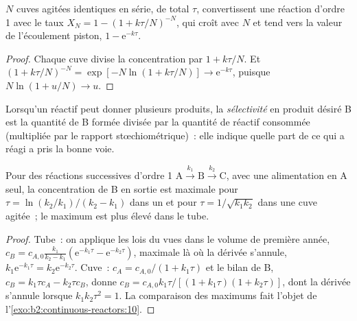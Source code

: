 \begin{proposition}\label{prop:b2:continuous-reactors:cascade}
$N$ cuves agitées identiques en série, de  total $\tau$, convertissent une
réaction d'ordre 1 avec le taux $X_N = 1 - (1 + k\tau/N)^{-N}$, qui croît avec
$N$ et tend vers la valeur de l'écoulement piston, $1 - \mathrm e^{-k\tau}$.
\end{proposition}

\begin{proof}
Chaque cuve divise la concentration par $1 + k\tau/N$. Et $(1 +
k\tau/N)^{-N} = \exp[-N\ln(1 + k\tau/N)] \to \mathrm e^{-k\tau}$, puisque
$N\ln(1 + u/N) \to u$.
\end{proof}

\begin{definition}[Sélectivité]\label{def:b2:continuous-reactors:selectivity}
Lorsqu'un réactif peut donner plusieurs produits, la \emph{sélectivité}
en produit désiré B est la quantité de B formée divisée par la quantité de
réactif consommée (multipliée par le rapport stœchiométrique)~: elle indique quelle part de
ce qui a réagi a pris la bonne voie.
\end{definition}

\begin{proposition}\label{prop:b2:continuous-reactors:consecutive}
Pour des réactions successives d'ordre 1 $\mathrm A \xrightarrow{k_1} \mathrm B
\xrightarrow{k_2} \mathrm C$, avec une alimentation en A seul, la concentration
de B en sortie est maximale pour $\tau = \ln(k_2/k_1)/(k_2 - k_1)$ dans un
 et pour $\tau = 1/\sqrt{k_1k_2}$ dans une cuve agitée~; le
maximum est plus élevé dans le tube.
\end{proposition}

\begin{proof}
Tube~: on applique les lois du  vues dans le volume de première année, $c_B = c_{A,0}\frac{k_1}{k_2 - k_1}
(\mathrm e^{-k_1\tau} - \mathrm e^{-k_2\tau})$, maximale là où la dérivée
s'annule, $k_1\mathrm e^{-k_1\tau} = k_2\mathrm e^{-k_2\tau}$. Cuve~: $c_A =
c_{A,0}/(1 + k_1\tau)$ et le bilan de B, $c_B = k_1\tau c_A - k_2\tau c_B$,
donne $c_B = c_{A,0}k_1\tau/[(1 + k_1\tau)(1 + k_2\tau)]$, dont la dérivée
s'annule lorsque $k_1k_2\tau^2 = 1$. La comparaison des maximums fait l'objet de
l'\cref{exo:b2:continuous-reactors:10}.
\end{proof}

